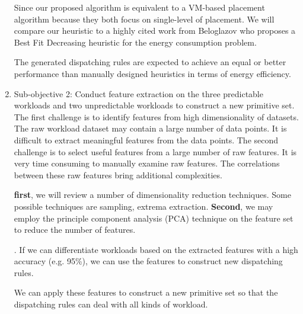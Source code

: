 \begin{enumerate}
	 Since our proposed algorithm is equivalent to a VM-based placement algorithm because they both focus on single-level of placement. We will compare our heuristic to a highly cited work \cite{Beloglazov:2012ji} from Beloglazov who proposes a Best Fit Decreasing heuristic for the energy consumption problem.

	 The generated dispatching rules are expected to achieve an equal or better performance than manually designed heuristics in terms of energy efficiency. 

	\item Sub-objective 2: Conduct feature extraction on the three predictable workloads and two unpredictable workloads to construct a new primitive set. \\
	
	 The first challenge is to identify features from high dimensionality of datasets. The raw workload dataset may contain a large number of data points. It is difficult to extract meaningful features from the data points. The second challenge is to select useful features from a large number of raw features. It is very time consuming to manually examine raw features. The correlations between these raw features bring additional complexities.

	 \textbf{first}, we will review a number of dimensionality reduction techniques. Some possible techniques are sampling, extrema extraction. \textbf{Second}, we may employ the principle component analysis (PCA) technique on the feature set to reduce the number of features. 

	. If we can differentiate workloads based on the extracted features with a high accuracy (e.g. 95\%), we can use the features to construct new dispatching rules. 

	 We can apply these features to construct a new primitive set so that the dispatching rules can deal with all kinds of workload.



\end{enumerate}

